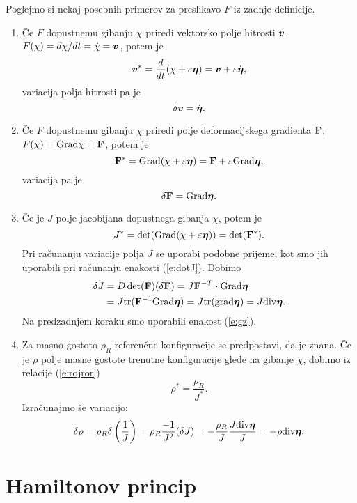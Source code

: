 \begin{primeri}
	Poglejmo si nekaj posebnih primerov za preslikavo $F$ iz zadnje definicije.
	\begin{enumerate}
		\item
			Če $F$ dopustnemu gibanju $\chi$ priredi vektorsko polje hitrosti $\boldsymbol v$,
			$F(\chi)=d\chi/dt=\dot{\chi}=\boldsymbol v$, potem je
			\[ \boldsymbol v^*=\frac{d}{dt}(\chi+\varepsilon\boldsymbol \eta)=\boldsymbol v+\varepsilon\dot{\boldsymbol \eta}, \]
			variacija polja hitrosti pa je
			\[ \delta\boldsymbol v=\dot{\boldsymbol \eta}. \]
		\item
			Če $F$ dopustnemu gibanju $\chi$ priredi polje deformacijskega gradienta $\mathbf F$,
			$F(\chi)=\mathrm{Grad}{\chi}=\mathbf F$, potem je
			\[ \mathbf F^*=\mathrm{Grad}(\chi+\varepsilon\boldsymbol \eta)=\mathbf F+\varepsilon\mathrm{Grad}\boldsymbol \eta, \]
			variacija pa je
			\begin{equation} \label{e:deltaF}
				\delta\mathbf F=\mathrm{Grad}\boldsymbol \eta.
			\end{equation}
		\item
			Če je $J$ polje jacobijana dopustnega gibanja $\chi$, potem je
			\[ J^*=\det(\mathrm{Grad}(\chi+\varepsilon\boldsymbol \eta))=\det(\mathbf F^*). \]
			Pri računanju variacije polja $J$ se uporabi podobne prijeme,
			kot smo jih uporabili pri računanju enakosti (\ref{e:dotJ}). Dobimo
			\begin{align*}
				\delta J&=D\det(\mathbf F)(\delta\mathbf F)=J\mathbf F^{-T}\cdot\mathrm{Grad}\boldsymbol \eta\\
				&=J\mathrm{tr}(\mathbf F^{-1}\mathrm{Grad}\boldsymbol \eta)=J\mathrm{tr}(\mathrm{grad}\boldsymbol \eta)=J\mathrm{div}\boldsymbol \eta.
			\end{align*}
			Na predzadnjem koraku smo uporabili enakost (\ref{e:gz}).
		\item
			Za masno gostoto $\rho_R$ referenčne konfiguracije se predpostavi, da je znana. Če je
			$\rho$ polje masne gostote trenutne konfiguracije glede na gibanje $\chi$,
			dobimo iz relacije (\ref{e:rojror})
			\[ \rho^*=\frac{\rho_R}{J^*}. \]
			Izračunajmo še variacijo:
			\begin{equation} \label{e:deltarho}
				\delta\rho=\rho_R\delta\left(\frac{1}{J}\right)=
				\rho_R\frac{-1}{J^2}(\delta J)=-\frac{\rho_R}{J}\frac{J\mathrm{div}\boldsymbol \eta}{J}=-\rho\mathrm{div}\boldsymbol \eta.
			\end{equation}
	\end{enumerate}
\end{primeri}


\section{Hamiltonov princip}


